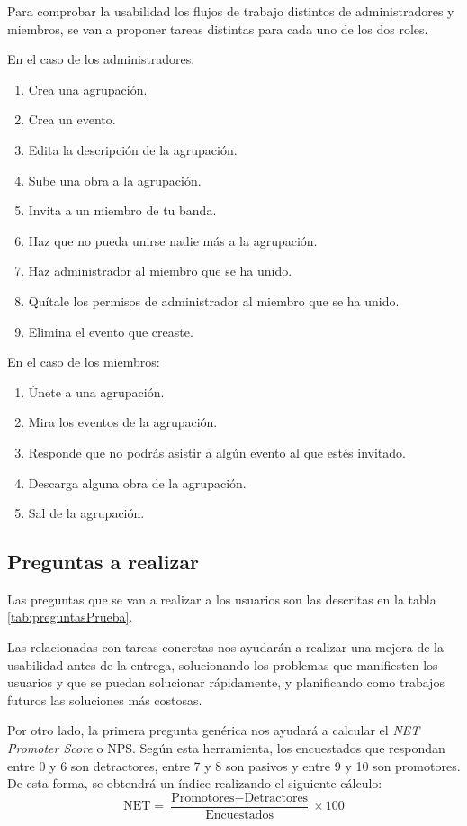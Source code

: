 Para comprobar la usabilidad los flujos de trabajo distintos de administradores y miembros, se van a proponer tareas distintas para cada uno de los dos roles.

En el caso de los administradores:

\begin{enumerate}
    \item Crea una agrupación.
    \item Crea un evento.
    \item Edita la descripción de la agrupación.
    \item Sube una obra a la agrupación.
    \item Invita a un miembro de tu banda.
    \item Haz que no pueda unirse nadie más a la agrupación.
    \item Haz administrador al miembro que se ha unido.
    \item Quítale los permisos de administrador al miembro que se ha unido.
    \item Elimina el evento que creaste.
\end{enumerate}

En el caso de los miembros:

\begin{enumerate}
    \item Únete a una agrupación.
    \item Mira los eventos de la agrupación.
    \item Responde que no podrás asistir a algún evento al que estés invitado.
    \item Descarga alguna obra de la agrupación.
    \item Sal de la agrupación.
\end{enumerate}


\subsection{Preguntas a realizar}

Las preguntas que se van a realizar a los usuarios son las descritas en la tabla \ref{tab:preguntasPrueba}.

Las relacionadas con tareas concretas nos ayudarán a realizar una mejora de la usabilidad antes de la entrega, solucionando los problemas que manifiesten los usuarios y que se puedan solucionar rápidamente, y planificando como trabajos futuros las soluciones más costosas.

Por otro lado, la primera pregunta genérica nos ayudará a calcular el \textit{NET Promoter Score} o NPS. Según esta herramienta, los encuestados que respondan entre 0 y 6 son detractores, entre 7 y 8 son pasivos y entre 9 y 10 son promotores. De esta forma, se obtendrá un índice realizando el siguiente cálculo:
\[
\textrm{NET} = \frac{\textrm{Promotores} - \textrm{Detractores}}{\textrm{Encuestados}} \times 100
\]

